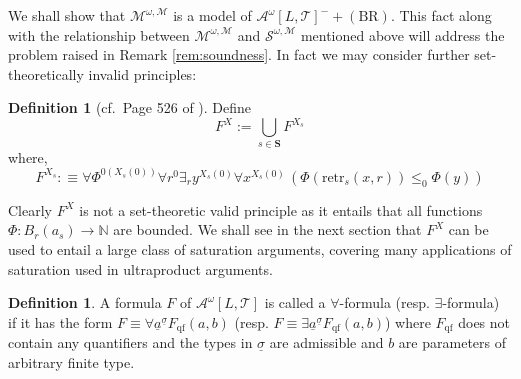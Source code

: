 \documentclass[11pt]{amsart}
\theoremstyle{definition}
\newtheorem{definition}[theorem]{Definition}
\theoremstyle{remark}
\def\NN{\mathbb{N}}
\begin{document}
 We shall show that $\mathcal{M}^{\omega,\mathscr{M}}$ is a model of $\mathcal{A}^\omega[L,\mathcal{T}]^-+(\mathrm{BR})$. This fact along with the relationship between $\mathcal{M}^{\omega,\mathscr{M}}$ and $\mathcal{S}^{\omega,\mathscr{M}}$ mentioned above will address the problem raised in Remark \ref{rem:soundness}. In fact we may consider further set-theoretically invalid principles: 
\begin{definition}[cf.\ Page 526 of \cite{GuK2016}]
Define 
\[
F^X:=\bigcup_{s \in \mathbf{S}}  F^{X_s}
\]
where,
    \[
     F^{X_s}:\equiv 
            \forall \Phi^{0(X_s(0))}\forall r^0 \exists_{r} y^{X_s(0)}\forall x^{X_s(0)}\,(\Phi(\mathrm{retr}_s(x,r))\le_0 \Phi(y))
    \]
\end{definition}
 Clearly $F^X$ is not a set-theoretic valid principle as it entails that all functions $\Phi: B_r(a_s) \to \NN$ are bounded. We shall see in the next section that  $F^X$ can be used to entail a large class of saturation arguments, covering many applications of saturation used in ultraproduct arguments. 
\begin{definition}
 A formula $F$ of $\mathcal{A}^\omega[L,\mathcal{T}]$ is called a $\forall$-formula (resp. $\exists$-formula) if it
has the form $F \equiv \forall \underline{a}^{\underline{\sigma}}
F_{\mathrm{qf}}(a, b)$ (resp. $F \equiv\exists \underline{a}^{\underline{\sigma}}
F_{\mathrm{qf}}(a, b)$) where $F_{\mathrm{qf}}$ does not contain any quantifiers and the types in $\underline{\sigma}$ are admissible and $b$ are parameters of arbitrary finite type.
\end{definition}
\end{document}
